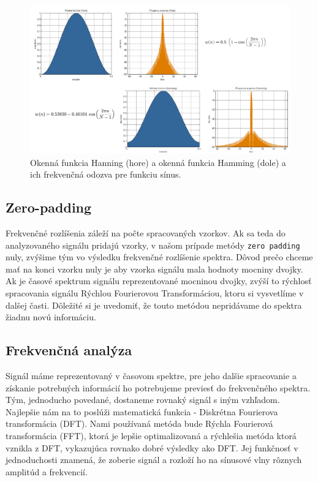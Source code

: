     \begin{figure}[h]
        \centering
        \includegraphics[width=.9\textwidth]{obrazky-figures/okennefunkcie.png}
        \caption{Okenná funkcia Hanning (hore) a okenná funkcia Hamming (dole) a ich frekvenčná odozva pre funkciu sínus\cite{flexradio}.}
        \label{fig:okennefunkcie}
    \end{figure}

  \subsection{Zero-padding}

    \hspace{0.6cm}Frekvenčné rozlíšenia záleží na počte spracovaných vzorkov. Ak sa teda do analyzovaného signálu pridajú vzorky, v našom prípade metódy \verb|zero padding| nuly, zvýšime tým vo výsledku frekvenčné rozlíšenie spektra.
    Dôvod prečo chceme mať na konci vzorku nuly je aby vzorka signálu mala hodnoty mocniny dvojky. Ak je časové spektrum signálu reprezentované mocninou dvojky, zvýší to rýchlosť spracovania signálu Rýchlou Fourierovou Transformáciou, ktoru si vysvetlíme v dalšej časti.
    Dôležité si je uvedomiť, že touto metódou nepridávame do spektra žiadnu novú informáciu.\cite{understandingsignals}\newline


  \subsection{Frekvenčná analýza}

    \hspace{0.6cm}Signál máme reprezentovaný v časovom spektre, pre jeho dalšie spracovanie a získanie potrebných informácií ho potrebujeme previesť do frekvenčného spektra. Tým, jednoducho povedané, dostaneme rovnaký signál s iným vzhľadom. Najlepšie nám na to poslúži matematická funkcia - Diskrétna Fourierova transformácia (DFT). Nami používaná metóda bude Rýchla Fourierová transformácia (FFT), ktorá je lepšie optimalizovaná a rýchlešia metóda ktorá vznikla z DFT, vykazujúca rovnako dobré výsledky ako DFT. Jej funkčnosť v jednoduchosti znamená, že zoberie signál a rozloží ho na sínusové vlny rôznych amplitúd a frekvencií\cite{understandingsignals}\cite{undestandingfft}.\newline

